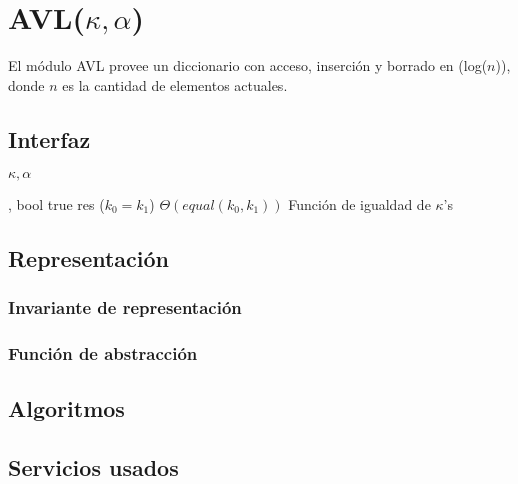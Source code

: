 \section{AVL($\kappa, \alpha$)}

El módulo AVL provee un diccionario con acceso, inserción y borrado en \bigo(log($n$)), donde $n$ es la cantidad de elementos actuales.

\subsection{Interfaz}

\begin{iparamformales}{$\kappa, \alpha$}

    \funcion{$\bullet = \bullet$} %
        {, } %
        {bool} %
        {true} %
        {res \igobs ($k_0 = k_1$)} %
        {$\Theta(equal(k_0, k_1))$} %
        {} %
        {Función de igualdad de $\kappa$'s} %

\end{iparamformales}

\iusa{}

\subsection{Representación}

\subsubsection{Invariante de representación}

\subsubsection{Función de abstracción}

\subsection{Algoritmos}

\subsection{Servicios usados}


